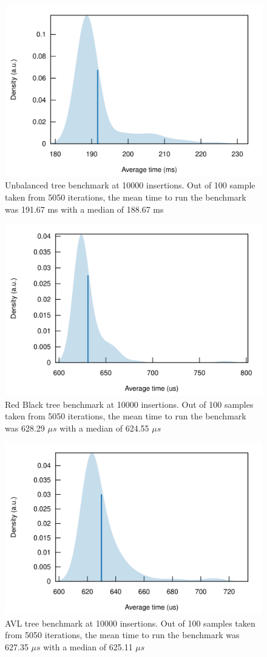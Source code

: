 \documentclass[letterpaper]{article}
\begin{document}
\begin{figure}[H]
      \centering
      \includegraphics[width=.8\textwidth]{bsbench.png}
      \caption{Unbalanced tree benchmark at 10000 insertions. Out of 100 sample
      taken from 5050 iterations, the mean time to run the benchmark was
    191.67 ms with a median of 188.67 ms}
\end{figure}

\begin{figure}[H]
      \centering
      \includegraphics[width=.8\textwidth]{rbsmol.png}
      \caption{Red Black tree benchmark at 10000 insertions. Out of 100 samples
      taken from 5050 iterations, the mean time to run the benchmark was 628.29
    $\mu s$ with a median of 624.55 $\mu s$}
\end{figure}

\begin{figure}[H]
      \centering
      \includegraphics[width=.8\textwidth]{avlsmol.png}
      \caption{AVL tree benchmark at 10000 insertions. Out of 100 samples taken
        from 5050 iterations,
      the mean time to run the benchmark was 627.35 $\mu s$ with a median of
    625.11 $\mu s$}
\end{figure}
\end{document}
